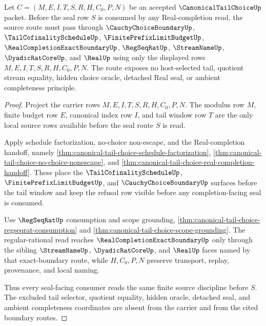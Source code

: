 \begin{theorem}
\label{thm:canonical-tail-choice-scoped-source-discipline}
Let $C=(M,E,I,T,S,R,H,C_0,P,N)$ be an accepted $\CanonicalTailChoiceUp$ packet. Before the seal row $S$ is consumed by any Real-completion read, the source route must pass through $\CauchyChoiceBoundaryUp$, $\TailCofinalityScheduleUp$, $\FinitePrefixLimitBudgetUp$, $\RealCompletionExactBoundaryUp$, $\RegSeqRatUp$, $\StreamNameUp$, $\DyadicRatCoreUp$, and $\RealUp$ using only the displayed rows $M,E,I,T,S,R,H,C_0,P,N$. The route exposes no host-selected tail, quotient stream equality, hidden choice oracle, detached Real seal, or ambient completeness principle.
\end{theorem}
\begin{proof}
Project the carrier rows $M,E,I,T,S,R,H,C_0,P,N$. The modulus row $M$, finite budget row $E$, canonical index row $I$, and tail window row $T$ are the only local source rows available before the seal route $S$ is read.

Apply schedule factorization, no-choice non-escape, and the Real-completion handoff, namely \autoref{thm:canonical-tail-choice-schedule-factorization}, \autoref{thm:canonical-tail-choice-no-choice-nonescape}, and \autoref{thm:canonical-tail-choice-real-completion-handoff}. These place the $\TailCofinalityScheduleUp$, $\FinitePrefixLimitBudgetUp$, and $\CauchyChoiceBoundaryUp$ surfaces before the tail window and keep the refusal row visible before any completion-facing seal is consumed.

Use $\RegSeqRatUp$ consumption and scope grounding, \autoref{thm:canonical-tail-choice-regseqrat-consumption} and \autoref{thm:canonical-tail-choice-scope-grounding}. The regular-rational read reaches $\RealCompletionExactBoundaryUp$ only through the sibling $\StreamNameUp$, $\DyadicRatCoreUp$, and $\RealUp$ faces named by that exact-boundary route, while $H,C_0,P,N$ preserve transport, replay, provenance, and local naming.

Thus every seal-facing consumer reads the same finite source discipline before $S$. The excluded tail selector, quotient equality, hidden oracle, detached seal, and ambient completeness coordinates are absent from the carrier and from the cited boundary routes.
\end{proof}

